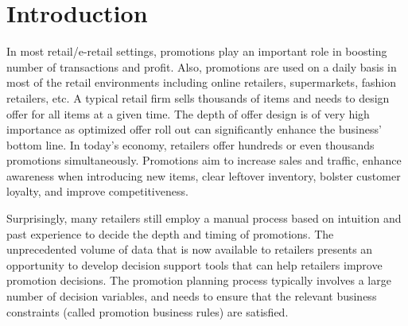 \section{Introduction}
In most retail/e-retail settings, promotions play an important role in boosting number of transactions and profit.
Also, promotions are used on a daily basis in most of the retail environments including online retailers, 
supermarkets, fashion retailers, etc. A typical retail firm sells thousands of items and needs to design offer 
for all items at a given time. The depth of offer design is of very high importance as optimized 
offer roll out can significantly enhance the business’ bottom line.
In today’s economy, retailers offer hundreds or even thousands promotions simultaneously. Promotions aim to increase 
sales and traffic, enhance awareness when introducing new items, clear leftover inventory, bolster customer loyalty, 
and improve competitiveness.

Surprisingly, many retailers still employ a manual process based on intuition and past experience to decide the depth and 
timing of promotions. The unprecedented volume of data that is now available to retailers presents an opportunity to develop 
decision support tools that can help retailers improve promotion decisions. The promotion planning process typically 
involves a large number of decision variables, and needs to ensure that the relevant business constraints (called 
promotion business rules) are satisfied.